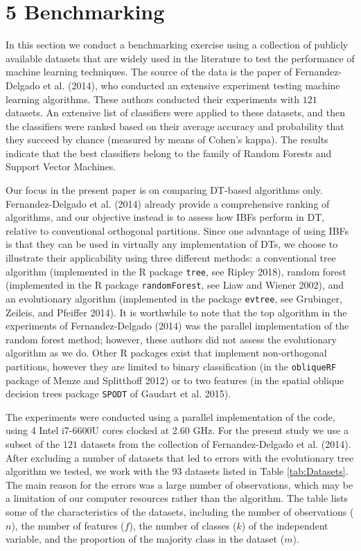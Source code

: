 \documentclass[]{elsarticle} %
\begin{document}
\section{5 Benchmarking}\label{benchmarking}

In this section we conduct a benchmarking exercise using a collection of
publicly available datasets that are widely used in the literature to
test the performance of machine learning techniques. The source of the
data is the paper of Fernandez-Delgado et al. (2014), who conducted an
extensive experiment testing machine learning algorithms. These authors
conducted their experiments with \(121\) datasets. An extensive list of
classifiers were applied to these datasets, and then the classifiers
were ranked based on their average accuracy and probability that they
succeed by chance (measured by means of Cohen's kappa). The results
indicate that the best classifiers belong to the family of Random
Forests and Support Vector Machines.

Our focus in the present paper is on comparing DT-based algorithms only.
Fernandez-Delgado et al. (2014) already provide a comprehensive ranking
of algorithms, and our objective instead is to assess how IBFs perform
in DT, relative to conventional orthogonal partitions. Since one
advantage of using IBFs is that they can be used in virtually any
implementation of DTs, we choose to illustrate their applicability using
three different methods: a conventional tree algorithm (implemented in
the R package \texttt{tree}, see Ripley 2018), random forest
(implemented in the R package \texttt{randomForest}, see Liaw and Wiener
2002), and an evolutionary algorithm (implemented in the package
\texttt{evtree}, see Grubinger, Zeileis, and Pfeiffer 2014). It is
worthwhile to note that the top algorithm in the experiments of
Fernandez-Delgado (2014) was the parallel implementation of the random
forest method; however, these authors did not assess the evolutionary
algorithm as we do. Other R packages exist that implement non-orthogonal
partitions, however they are limited to binary classification (in the
\texttt{obliqueRF} package of Menze and Splitthoff 2012) or to two
features (in the spatial oblique decision trees package \texttt{SPODT}
of Gaudart et al. 2015).

The experiments were conducted using a parallel implementation of the
code, using 4 Intel i7-6600U cores clocked at 2.60 GHz. For the present
study we use a subset of the \(121\) datasets from the collection of
Fernandez-Delgado et al. (2014). After excluding a number of datasets
that led to errors with the evolutionary tree algorithm we tested, we
work with the \(93\) datasets listed in Table \ref{tab:Datasets}. The
main reason for the errors was a large number of observations, which may
be a limitation of our computer resources rather than the algorithm. The
table lists some of the characteristics of the datasets, including the
number of observations (\(n\)), the number of features (\(f\)), the
number of classes (\(k\)) of the independent variable, and the
proportion of the majority class in the dataset (\(m\)).
\end{document}
